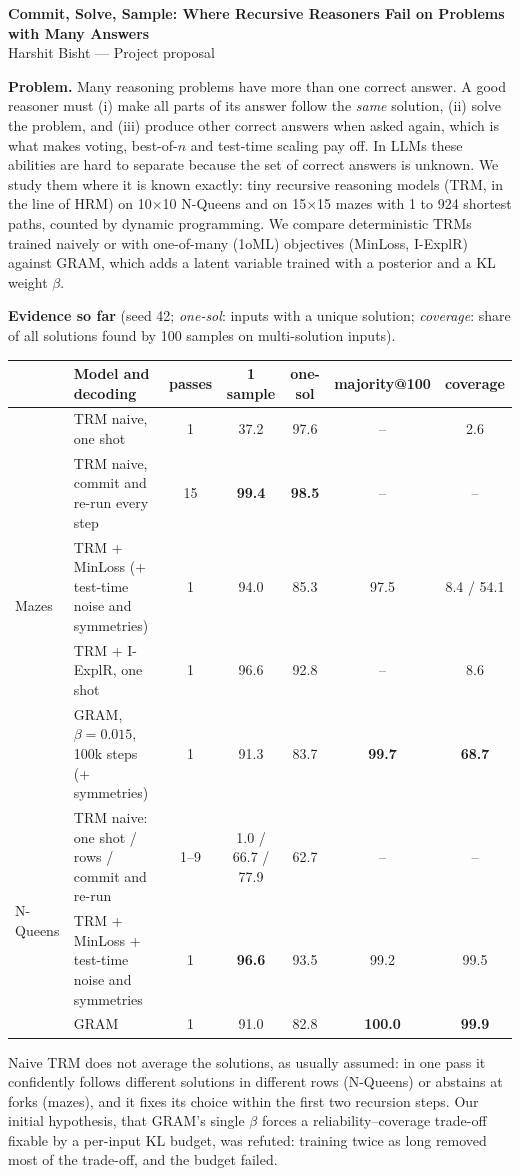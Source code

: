 \documentclass[10pt]{article}
\begin{document}
\begin{center}
{\large\bfseries Commit, Solve, Sample: Where Recursive Reasoners Fail on Problems with Many Answers}\\[2pt]
Harshit Bisht \quad--- \quad Project proposal
\end{center}

\textbf{Problem.} Many reasoning problems have more than one correct answer. A good reasoner must (i) make all parts
of its answer follow the \emph{same} solution, (ii) solve the problem, and (iii) produce other correct answers when
asked again, which is what makes voting, best-of-$n$ and test-time scaling pay off. In LLMs these abilities are hard to
separate because the set of correct answers is unknown. We study them where it is known exactly: tiny recursive
reasoning models (TRM, in the line of HRM) on 10$\times$10 N-Queens and on 15$\times$15 mazes with 1 to 924 shortest
paths, counted by dynamic programming. We compare deterministic TRMs trained naively or with one-of-many (1oML)
objectives (MinLoss, I-ExplR) against GRAM, which adds a latent variable trained with a posterior and a KL weight
$\beta$.

\textbf{Evidence so far} (seed 42; \emph{one-sol}: inputs with a unique solution; \emph{coverage}: share of all
solutions found by 100 samples on multi-solution inputs).
\vspace{-3pt}
\begin{center}\small
\begin{tabular}{@{}llccccc@{}}
\toprule
& Model and decoding & passes & 1 sample & one-sol & majority@100 & coverage \\
\midrule
\multirow{5}{*}{Mazes} & TRM naive, one shot & 1 & 37.2 & 97.6 & -- & 2.6 \\
& TRM naive, commit and re-run every step & 15 & \textbf{99.4} & \textbf{98.5} & -- & -- \\
& TRM + MinLoss (+ test-time noise and symmetries) & 1 & 94.0 & 85.3 & 97.5 & 8.4 / 54.1 \\
& TRM + I-ExplR, one shot & 1 & 96.6 & 92.8 & -- & 8.6 \\
& GRAM, $\beta=0.015$, 100k steps (+ symmetries) & 1 & 91.3 & 83.7 & \textbf{99.7} & \textbf{68.7} \\
\midrule
\multirow{4}{*}{N-Queens} & TRM naive: one shot / rows / commit and re-run & 1--9 & 1.0 / 66.7 / 77.9 & 62.7 & -- & -- \\
& TRM + MinLoss + test-time noise and symmetries & 1 & \textbf{96.6} & 93.5 & 99.2 & 99.5 \\
& GRAM & 1 & 91.0 & 82.8 & \textbf{100.0} & \textbf{99.9} \\
\bottomrule
\end{tabular}
\end{center}
\vspace{-3pt}
Naive TRM does not average the solutions, as usually assumed: in one pass it confidently follows different solutions
in different rows (N-Queens) or abstains at forks (mazes), and it fixes its choice within the first two recursion
steps. Our initial hypothesis, that GRAM's single $\beta$ forces a reliability--coverage trade-off fixable by a
per-input KL budget, was refuted: training twice as long removed most of the trade-off, and the budget failed.
\end{document}
